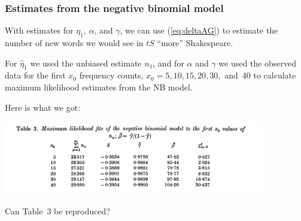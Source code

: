 \begin{frame}
    \frametitle{Estimates from the negative binomial model}
	With estimates for $\eta_1$, $\alpha$, and $\gamma$, we can use (\ref{eq:deltaAG}) to estimate the number of new words we would see in $tS$ ``more'' Shakespeare.
	\medskip
	
	For $\hat\eta_1$ we used the unbiased estimate $n_1$, and for $\alpha$ and $\gamma$ we used the observed data for the first $x_0$ frequency counts, $x_0=5, 10, 15, 20, 30,$ and~$40$ to calculate maximum likelihood estimates from the NB model.
	\pause
	
	Here is what we got:
	\vspace*{-5mm}
	\begin{center}
		\includegraphics[width=4.5in]{../compendium/Figures/ET-Table3.pdf}
	\end{center}
	\pause	
	{\color{red} Can Table~3 be reproduced?}
\end{frame}
